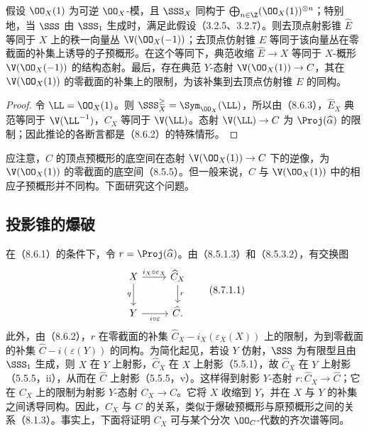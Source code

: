 假设 $\OO_X(1)$ 为可逆 $\OO_X$-模，且 $\SSS_X$ 同构于 $\bigoplus_{n\in\Z}(\OO_X(1))^{\otimes n}$；特别地，当 $\SSS$ 由 $\SSS_1$ 生成时，满足此假设（3.2.5、3.2.7）。则去顶点射影锥 $\widehat E$ 等同于 $X$ 上的秩一向量丛 $\V(\OO_X(-1))$；去顶点仿射锥 $E$ 等同于该向量丛在零截面的补集上诱导的子预概形。在这个等同下，典范收缩 $\widehat E\to X$ 等同于 $X$-概形 $\V(\OO_X(-1))$ 的结构态射。最后，存在典范 $Y$-态射 $\V(\OO_X(1))\to C$，其在 $\V(\OO_X(1))$ 的零截面的补集上的限制，为该补集到去顶点仿射锥 $E$ 的同构。
\begin{proof}
令 $\LL=\OO_X(1)$。则 $\SSS_X^{\geq}=\Sym_{\OO_X}(\LL)$，所以由（8.6.3），$\widehat E_X$ 典范等同于 $\V(\LL^{-1})$，$C_X$ 等同于 $\V(\LL)$。态射 $\V(\LL)\to C$ 为 $\Proj(\widehat\alpha)$ 的限制；因此推论的各断言都是（8.6.2）的特殊情形。
\end{proof}
应注意，$C$ 的顶点预概形的底空间在态射 $\V(\OO_X(1))\to C$ 下的逆像，为 $\V(\OO_X(1))$ 的零截面的底空间（8.5.5）。但一般来说，$C$ 与 $\V(\OO_X(1))$ 中的相应子预概形并不同构。下面研究这个问题。

\subsection{投影锥的爆破}
在（8.6.1）的条件下，令 $r=\Proj(\widehat\alpha)$。由（8.5.1.3）和（8.5.3.2），有交换图
\begin{equation}
\begin{tikzcd}
X \arrow[r,"i_X\circ\varepsilon_X"] \arrow[d,"q"'] & \widehat C_X \arrow[d,"r"] \\
Y \arrow[r,"i\circ\varepsilon"'] & \widehat C.
\end{tikzcd}
\tag{8.7.1.1}
\end{equation}
此外，由（8.6.2），$r$ 在零截面的补集 $\widehat C_X-i_X(\varepsilon_X(X))$ 上的限制，为到零截面的补集 $\widehat C-i(\varepsilon(Y))$ 的同构。为简化起见，若设 $Y$ 仿射，$\SSS$ 为有限型且由 $\SSS_1$ 生成，则 $X$ 在 $Y$ 上射影，$\widehat C_X$ 在 $X$ 上射影（5.5.1），故 $\widehat C_X$ 在 $Y$ 上射影（5.5.5，ii），从而在 $\widehat C$ 上射影（5.5.5，v）。这样得到射影 $Y$-态射 $r:\widehat C_X\to\widehat C$；它在 $C_X$ 上的限制为射影 $Y$-态射 $C_X\to C$。它将 $X$ 收缩到 $Y$，并在 $X$ 与 $Y$ 的补集之间诱导同构。因此，$C_X$ 与 $C$ 的关系，类似于爆破预概形与原预概形之间的关系（8.1.3）。事实上，下面将证明 $C_X$ 可与某个分次 $\OO_C$-代数的齐次谱等同。

